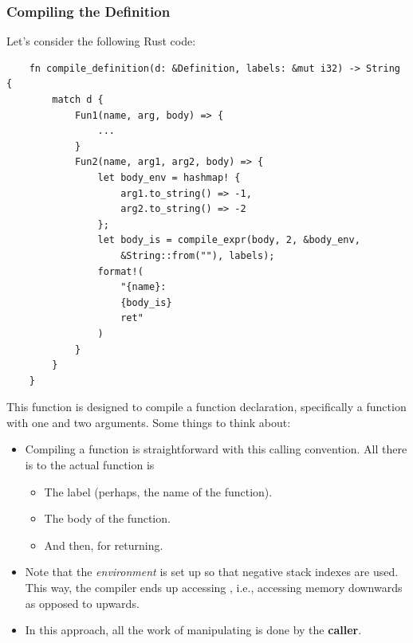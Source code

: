 \documentclass[letterpaper]{article}
\begin{document}
\subsubsection{Compiling the Definition}
Let's consider the following Rust code: 
\begin{verbatim}
    fn compile_definition(d: &Definition, labels: &mut i32) -> String {
        match d {
            Fun1(name, arg, body) => {
                ...
            }
            Fun2(name, arg1, arg2, body) => {
                let body_env = hashmap! {
                    arg1.to_string() => -1,
                    arg2.to_string() => -2
                };
                let body_is = compile_expr(body, 2, &body_env, 
                    &String::from(""), labels);
                format!(
                    "{name}:
                    {body_is}
                    ret"
                )
            }
        }
    }\end{verbatim}
This function is designed to compile a function declaration, specifically a function with one and two arguments. Some things to think about: 
\begin{itemize}
    \item Compiling a function is straightforward with this calling convention. All there is to the actual function is 
    \begin{itemize}
        \item The label (perhaps, the name of the function).
        \item The body of the function. 
        \item And then,  for returning.
    \end{itemize}
    \item Note that the \emph{environment} is set up so that negative stack indexes are used. This way, the compiler ends up accessing \code{[rsp + X]}, i.e., accessing memory downwards as opposed to upwards. 
    \item In this approach, all the work of manipulating  is done by the \textbf{caller}.
\end{itemize}
\end{document}
